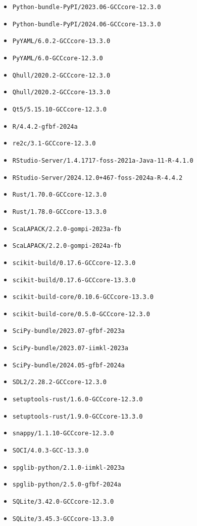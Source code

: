 \begin{multicols}{3}
\begin{itemize}
\item \verb|Python-bundle-PyPI/2023.06-GCCcore-12.3.0|
\item \verb|Python-bundle-PyPI/2024.06-GCCcore-13.3.0|
\item \verb|PyYAML/6.0.2-GCCcore-13.3.0|
\item \verb|PyYAML/6.0-GCCcore-12.3.0|
\item \verb|Qhull/2020.2-GCCcore-12.3.0|
\item \verb|Qhull/2020.2-GCCcore-13.3.0|
\item \verb|Qt5/5.15.10-GCCcore-12.3.0|
\item \verb|R/4.4.2-gfbf-2024a|
\item \verb|re2c/3.1-GCCcore-12.3.0|
\item \verb|RStudio-Server/1.4.1717-foss-2021a-Java-11-R-4.1.0|
\item \verb|RStudio-Server/2024.12.0+467-foss-2024a-R-4.4.2|
\item \verb|Rust/1.70.0-GCCcore-12.3.0|
\item \verb|Rust/1.78.0-GCCcore-13.3.0|
\item \verb|ScaLAPACK/2.2.0-gompi-2023a-fb|
\item \verb|ScaLAPACK/2.2.0-gompi-2024a-fb|
\item \verb|scikit-build/0.17.6-GCCcore-12.3.0|
\item \verb|scikit-build/0.17.6-GCCcore-13.3.0|
\item \verb|scikit-build-core/0.10.6-GCCcore-13.3.0|
\item \verb|scikit-build-core/0.5.0-GCCcore-12.3.0|
\item \verb|SciPy-bundle/2023.07-gfbf-2023a|
\item \verb|SciPy-bundle/2023.07-iimkl-2023a|
\item \verb|SciPy-bundle/2024.05-gfbf-2024a|
\item \verb|SDL2/2.28.2-GCCcore-12.3.0|
\item \verb|setuptools-rust/1.6.0-GCCcore-12.3.0|
\item \verb|setuptools-rust/1.9.0-GCCcore-13.3.0|
\item \verb|snappy/1.1.10-GCCcore-12.3.0|
\item \verb|SOCI/4.0.3-GCC-13.3.0|
\item \verb|spglib-python/2.1.0-iimkl-2023a|
\item \verb|spglib-python/2.5.0-gfbf-2024a|
\item \verb|SQLite/3.42.0-GCCcore-12.3.0|
\item \verb|SQLite/3.45.3-GCCcore-13.3.0|

\end{itemize}
\end{multicols}
